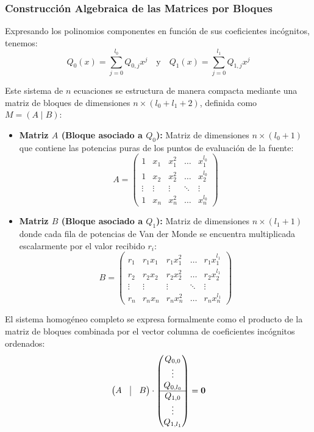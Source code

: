 \documentclass{article}
\begin{document}
\subsubsection{Construcción Algebraica de las Matrices por Bloques}

Expresando los polinomios componentes en función de sus coeficientes incógnitos, tenemos:
\[
Q_0(x) = \sum_{j=0}^{l_0} Q_{0,j} x^j \quad \text{y} \quad Q_1(x) = \sum_{j=0}^{l_1} Q_{1,j} x^j
\]

Este sistema de $n$ ecuaciones se estructura de manera compacta mediante una matriz de bloques de dimensiones $n \times (l_0 + l_1 + 2)$, definida como $M = (A \mid B)$:

\begin{itemize}
    \item \textbf{Matriz $A$ (Bloque asociado a $Q_0$):} Matriz de dimensiones $n \times (l_0 + 1)$ que contiene las potencias puras de los puntos de evaluación de la fuente:
    \[
    A = \begin{pmatrix} 
    1 & x_1 & x_1^2 & \dots & x_1^{l_0} \\
    1 & x_2 & x_2^2 & \dots & x_2^{l_0} \\
    \vdots & \vdots & \vdots & \ddots & \vdots \\
    1 & x_n & x_n^2 & \dots & x_n^{l_0}
    \end{pmatrix}
    \]

    \item \textbf{Matriz $B$ (Bloque asociado a $Q_1$):} Matriz de dimensiones $n \times (l_1 + 1)$ donde cada fila de potencias de Van der Monde se encuentra multiplicada escalarmente por el valor recibido $r_i$:
    \[
    B = \begin{pmatrix} 
    r_1 & r_1 x_1 & r_1 x_1^2 & \dots & r_1 x_1^{l_1} \\
    r_2 & r_2 x_2 & r_2 x_2^2 & \dots & r_2 x_2^{l_1} \\
    \vdots & \vdots & \vdots & \ddots & \vdots \\
    r_n & r_n x_n & r_n x_n^2 & \dots & r_n x_n^{l_1}
    \end{pmatrix}
    \]
\end{itemize}

El sistema homogéneo completo se expresa formalmente como el producto de la matriz de bloques combinada por el vector columna de coeficientes incógnitos ordenados:
\[
\begin{pmatrix} A & \vline & B \end{pmatrix} \cdot 
\begin{pmatrix} 
Q_{0,0} \\ \vdots \\ Q_{0,l_0} \\ \hline Q_{1,0} \\ \vdots \\ Q_{1,l_1} 
\end{pmatrix} = \mathbf{0}
\]
\end{document}
